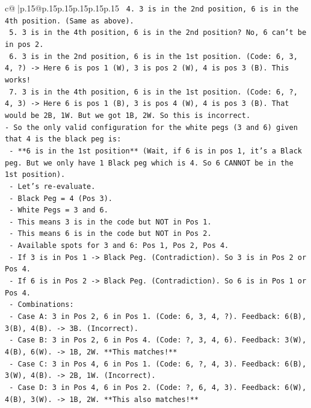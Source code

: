 \documentclass{article}
\begin{document}
{\begin{supertabular}{c@{$\;$}|p{.15\linewidth}@{}p{.15\linewidth}p{.15\linewidth}p{.15\linewidth}p{.15\linewidth}p{.15\linewidth}}
{{{\texttt{  4. 3 is in the 2nd position, 6 is in the 4th position. (Same as above).} \\
\texttt{  5. 3 is in the 4th position, 6 is in the 2nd position? No, 6 can't be in pos 2.} \\
\texttt{  6. 3 is in the 2nd position, 6 is in the 1st position. (Code: 6, 3, 4, ?) {-}> Here 6 is pos 1 (W), 3 is pos 2 (W), 4 is pos 3 (B). This works!} \\
\texttt{  7. 3 is in the 4th position, 6 is in the 1st position. (Code: 6, ?, 4, 3) {-}> Here 6 is pos 1 (B), 3 is pos 4 (W), 4 is pos 3 (B). That would be 2B, 1W. But we got 1B, 2W. So this is incorrect.} \\
\texttt{{-} So the only valid configuration for the white pegs (3 and 6) given that 4 is the black peg is:} \\
\texttt{  {-} **6 is in the 1st position** (Wait, if 6 is in pos 1, it's a Black peg. But we only have 1 Black peg which is 4. So 6 CANNOT be in the 1st position).} \\
\texttt{  {-} Let's re{-}evaluate.} \\
\texttt{  {-} Black Peg = 4 (Pos 3).} \\
\texttt{  {-} White Pegs = 3 and 6.} \\
\texttt{  {-} This means 3 is in the code but NOT in Pos 1.} \\
\texttt{  {-} This means 6 is in the code but NOT in Pos 2.} \\
\texttt{  {-} Available spots for 3 and 6: Pos 1, Pos 2, Pos 4.} \\
\texttt{  {-} If 3 is in Pos 1 {-}> Black Peg. (Contradiction). So 3 is in Pos 2 or Pos 4.} \\
\texttt{  {-} If 6 is in Pos 2 {-}> Black Peg. (Contradiction). So 6 is in Pos 1 or Pos 4.} \\
\texttt{  {-} Combinations:} \\
\texttt{    {-} Case A: 3 in Pos 2, 6 in Pos 1. (Code: 6, 3, 4, ?). Feedback: 6(B), 3(B), 4(B). {-}> 3B. (Incorrect).} \\
\texttt{    {-} Case B: 3 in Pos 2, 6 in Pos 4. (Code: ?, 3, 4, 6). Feedback: 3(W), 4(B), 6(W). {-}> 1B, 2W. **This matches!**} \\
\texttt{    {-} Case C: 3 in Pos 4, 6 in Pos 1. (Code: 6, ?, 4, 3). Feedback: 6(B), 3(W), 4(B). {-}> 2B, 1W. (Incorrect).} \\
\texttt{    {-} Case D: 3 in Pos 4, 6 in Pos 2. (Code: ?, 6, 4, 3). Feedback: 6(W), 4(B), 3(W). {-}> 1B, 2W. **This also matches!**} \\
}}}
\end{supertabular}}
\end{document}
